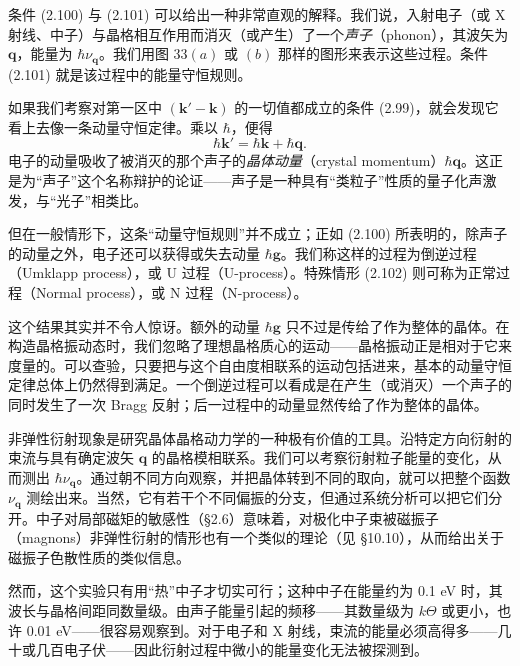 条件 (2.100) 与 (2.101) 可以给出一种非常直观的解释。我们说，入射电子（或 X 射线、中子）与晶格相互作用而消灭（或产生）了一个\emph{声子}（phonon），其波矢为 $\mathbf{q}$，能量为 $\hbar\nu_{\mathbf{q}}$。我们用图 33$(a)$ 或 $(b)$ 那样的图形来表示这些过程。条件 (2.101) 就是该过程中的能量守恒规则。

如果我们考察对第一区中 $(\mathbf{k}'-\mathbf{k})$ 的一切值都成立的条件 (2.99)，就会发现它看上去像一条动量守恒定律。乘以 $\hbar$，便得
\begin{equation*}
\hbar\mathbf{k}'=\hbar\mathbf{k}+\hbar\mathbf{q}.
\tag{2.102}
\end{equation*}
电子的动量吸收了被消灭的那个声子的\emph{晶体动量}（crystal momentum）$\hbar\mathbf{q}$。这正是为“声子”这个名称辩护的论证——声子是一种具有“类粒子”性质的量子化声激发，与“光子”相类比。


但在一般情形下，这条“动量守恒规则”并不成立；正如 (2.100) 所表明的，除声子的动量之外，电子还可以获得或失去动量 $\hbar\mathbf{g}$。我们称这样的过程为倒逆过程（Umklapp process），或 U 过程（U-process）。特殊情形 (2.102) 则可称为正常过程（Normal process），或 N 过程（N-process）。

这个结果其实并不令人惊讶。额外的动量 $\hbar\mathbf{g}$ 只不过是传给了作为整体的晶体。在构造晶格振动态时，我们忽略了理想晶格质心的运动——晶格振动正是相对于它来度量的。可以查验，只要把与这个自由度相联系的运动包括进来，基本的动量守恒定律总体上仍然得到满足。一个倒逆过程可以看成是在产生（或消灭）一个声子的同时发生了一次 Bragg 反射；后一过程中的动量显然传给了作为整体的晶体。

非弹性衍射现象是研究晶体晶格动力学的一种极有价值的工具。沿特定方向衍射的束流与具有确定波矢 $\mathbf{q}$ 的晶格模相联系。我们可以考察衍射粒子能量的变化，从而测出 $\hbar\nu_{\mathbf{q}}$。通过朝不同方向观察，并把晶体转到不同的取向，就可以把整个函数 $\nu_{\mathbf{q}}$ 测绘出来。当然，它有若干个不同偏振的分支，但通过系统分析可以把它们分开。中子对局部磁矩的敏感性（§2.6）意味着，对极化中子束被磁振子（magnons）非弹性衍射的情形也有一个类似的理论（见 §10.10），从而给出关于磁振子色散性质的类似信息。

然而，这个实验只有用“热”中子才切实可行；这种中子在能量约为 0.1 eV 时，其波长与晶格间距同数量级。由声子能量引起的频移——其数量级为 $k\Theta$ 或更小，也许 0.01 eV——很容易观察到。对于电子和 X 射线，束流的能量必须高得多——几十或几百电子伏——因此衍射过程中微小的能量变化无法被探测到。

